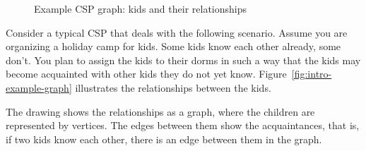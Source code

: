 \documentclass[thesis.tex]{subfiles}
\begin{document}
\begin{wrapfigure}{O}{12em}
\caption{Example CSP graph: kids and their relationships}
\label{fig:intro-example-graph}
\end{wrapfigure}
Consider a typical \gls{CSP} that deals with the following scenario. Assume you are organizing a holiday camp for kids. Some kids know each other already, some don't. You plan to assign the kids to their dorms in such a way that the kids may become acquainted with other kids they do not yet know. Figure~\vref{fig:intro-example-graph} illustrates the relationships between the kids.

The drawing shows the relationships as a graph, where the children are represented by vertices. The edges between them show the acquaintances, that is, if two kids know each other, there is an edge between them in the graph.

\end{document}
